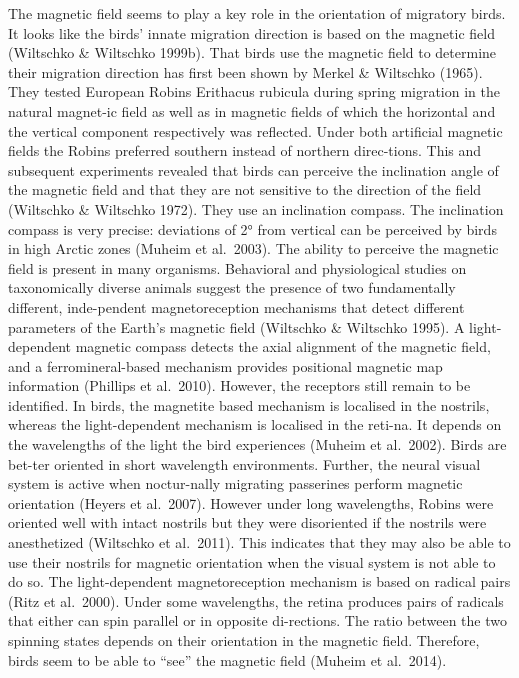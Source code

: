 \documentclass[
]{book}
\begin{document}
The magnetic field seems to play a key role in the orientation of migratory birds. It looks like the birds' innate migration direction is based on the magnetic field (Wiltschko \& Wiltschko 1999b). That birds use the magnetic field to determine their migration direction has first been shown by Merkel \& Wiltschko (1965). They tested European Robins Erithacus rubicula during spring migration in the natural magnet-ic field as well as in magnetic fields of which the horizontal and the vertical component respectively was reflected. Under both artificial magnetic fields the Robins preferred southern instead of northern direc-tions. This and subsequent experiments revealed that birds can perceive the inclination angle of the magnetic field and that they are not sensitive to the direction of the field (Wiltschko \& Wiltschko 1972). They use an inclination compass. The inclination compass is very precise: deviations of 2° from vertical can be perceived by birds in high Arctic zones (Muheim et al.~2003).
The ability to perceive the magnetic field is present in many organisms. Behavioral and physiological studies on taxonomically diverse animals suggest the presence of two fundamentally different, inde-pendent magnetoreception mechanisms that detect different parameters of the Earth's magnetic field (Wiltschko \& Wiltschko 1995). A light-dependent magnetic compass detects the axial alignment of the magnetic field, and a ferromineral-based mechanism provides positional magnetic map information (Phillips et al.~2010). However, the receptors still remain to be identified. In birds, the magnetite based mechanism is localised in the nostrils, whereas the light-dependent mechanism is localised in the reti-na. It depends on the wavelengths of the light the bird experiences (Muheim et al.~2002). Birds are bet-ter oriented in short wavelength environments. Further, the neural visual system is active when noctur-nally migrating passerines perform magnetic orientation (Heyers et al.~2007). However under long wavelengths, Robins were oriented well with intact nostrils but they were disoriented if the nostrils were anesthetized (Wiltschko et al.~2011). This indicates that they may also be able to use their nostrils for magnetic orientation when the visual system is not able to do so.
The light-dependent magnetoreception mechanism is based on radical pairs (Ritz et al.~2000). Under some wavelengths, the retina produces pairs of radicals that either can spin parallel or in opposite di-rections. The ratio between the two spinning states depends on their orientation in the magnetic field. Therefore, birds seem to be able to ``see'' the magnetic field (Muheim et al.~2014).
\end{document}
